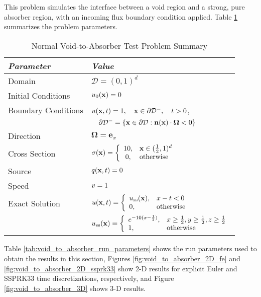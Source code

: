 This problem simulates the interface between a void region and a strong, pure absorber
region, with an incoming flux boundary condition applied.
Table \ref{tab:void_to_absorber} summarizes the problem parameters.

\begin{table}[htb]\caption{Normal Void-to-Absorber Test Problem Summary}
\label{tab:void_to_absorber}
\centering
\begin{tabular}{l l}\toprule
\emph{Parameter} & \emph{Value}\\\midrule
Domain & $\mathcal{D} = (0,1)^d$\\
Initial Conditions & $u_0(\mathbf{x})=0$\\
Boundary Conditions & $u(\mathbf{x},t)=1,\quad \mathbf{x}\in\partial\mathcal{D}^-,\quad t>0$,\\
   & $\quad\partial\mathcal{D}^-=\{\mathbf{x}\in\partial\mathcal{D}:\mathbf{n}(\mathbf{x})
       \cdot\mathbf{\Omega}<0\}$\\
Direction & $\mathbf{\Omega} = \mathbf{e}_x$\\
Cross Section & $\sigma(\mathbf{x})=\left\{\begin{array}{c l}
   10, & \mathbf{x}\in(\frac{1}{2},1)^d\\
   0,  & \mbox{otherwise}\end{array}\right.$\\
Source & $q(\mathbf{x},t)=0$\\
Speed & $v=1$\\
Exact Solution & $u(\mathbf{x},t)=\left\{\begin{array}{l l}
   u_{\text{ss}}(\mathbf{x}), & x-t<0\\
   0, & \mbox{otherwise}
   \end{array}\right.$ \\
   & $u_{\text{ss}}(\mathbf{x}) =
       \left\{\begin{array}{l l}
          e^{-10(x-\frac{1}{2})}, & x\ge\frac{1}{2}, y\ge\frac{1}{2}, z\ge\frac{1}{2}\\
          1,                      & \mbox{otherwise}
       \end{array}\right.$\\
\bottomrule\end{tabular}
\end{table}

Table \ref{tab:void_to_absorber_run_parameters} shows the run parameters used
to obtain the results in this section, Figures \ref{fig:void_to_absorber_2D_fe}
and \ref{fig:void_to_absorber_2D_ssprk33} show 2-D results for explicit Euler
and SSPRK33 time discretizations, respectively, and Figure
\ref{fig:void_to_absorber_3D} shows 3-D results.

